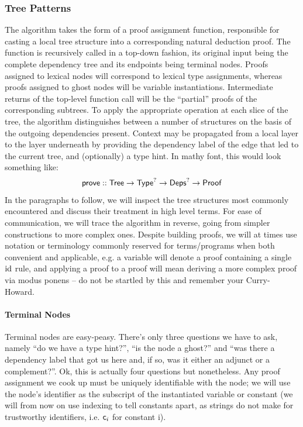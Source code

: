 \subsubsection{Tree Patterns}
The algorithm takes the form of a proof assignment function, responsible for casting a local tree structure into a corresponding natural deduction proof.
The function is recursively called in a top-down fashion, its original input being the complete dependency tree and its endpoints being terminal nodes.
Proofs assigned to lexical nodes will correspond to lexical type assignments, whereas proofs assigned to ghost nodes will be variable instantiations.
Intermediate returns of the top-level function call will be the ``partial'' proofs of the corresponding subtrees.
To apply the appropriate operation at each slice of the tree, the algorithm distinguishes between a number of structures on the basis of the outgoing dependencies present.
Context may be propagated from a local layer to the layer underneath by providing the dependency label of the edge that led to the current tree, and (optionally) a type hint.
In mathy font, this would look something like:
\begin{align*}
\mathsf{prove} :: \mathsf{Tree} \to \mathsf{Type}^? \to {\ensuremath{\mathsf{Deps}}}^? \to \mathsf{Proof}
\end{align*}
In the paragraphs to follow, we will inspect the tree structures most commonly encountered and discuss their treatment in high level terms.
For ease of communication, we will trace the algorithm in reverse, going from simpler constructions to more complex ones.
Despite building proofs, we will at times use notation or terminology commonly reserved for terms/programs when both convenient and applicable, e.g. a variable will denote a proof containing a single $\mathrm{id}$ rule, and applying a proof to a proof will mean deriving a more complex proof via modus ponens -- do not be startled by this and remember your Curry-Howard.

\paragraph{Terminal Nodes}
Terminal nodes are easy-peasy.
There's only three questions we have to ask, namely ``do we have a type hint?'', ``is the node a ghost?'' and ``was there a dependency label that got us here and, if so, was it either an adjunct or a complement?''.
Ok, this is actually four questions but nonetheless.
Any proof assignment we cook up must be uniquely identifiable with the node; we will use the node's identifier as the subscript of the instantiated variable or constant (we will from now on use indexing to tell constants apart, as strings do not make for trustworthy identifiers, i.e. $\mathsf{c}_{\mathnormal{i}}$ for constant i).

